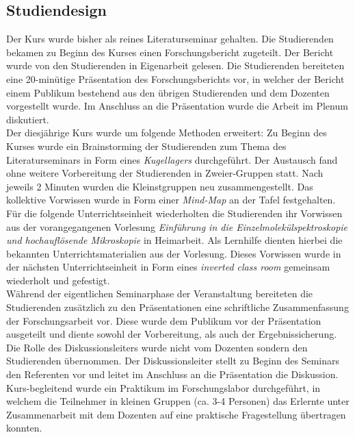 \subsection{Studiendesign}
Der Kurs wurde bisher als reines Literaturseminar gehalten. Die Studierenden bekamen zu Beginn des Kurses einen Forschungsbericht zugeteilt. Der Bericht wurde von den Studierenden in Eigenarbeit gelesen. Die Studierenden bereiteten eine 20-minütige Präsentation des Forschungsberichts vor, in welcher der Bericht einem Publikum bestehend aus den übrigen Studierenden und dem Dozenten vorgestellt wurde. Im Anschluss an die Präsentation wurde die Arbeit im Plenum diskutiert.\\
\noindent
Der diesjährige Kurs wurde um folgende Methoden erweitert: Zu Beginn des Kurses wurde ein Brainstorming der Studierenden zum Thema des Literaturseminars in Form eines {\it Kugellagers} durchgeführt. Der Austausch fand ohne weitere Vorbereitung der Studierenden in Zweier-Gruppen statt. Nach jeweils 2 Minuten wurden die Kleinstgruppen neu zusammengestellt. Das kollektive Vorwissen wurde in Form einer {\it Mind-Map} an der Tafel festgehalten. Für die folgende Unterrichtseinheit wiederholten die Studierenden ihr Vorwissen aus der vorangegangenen Vorlesung {\it Einführung in die Einzelmolekülspektroskopie und hochauflösende Mikroskopie} in Heimarbeit. Als Lernhilfe dienten hierbei die bekannten Unterrichtsmaterialien aus der Vorlesung. Dieses Vorwissen wurde in der nächsten Unterrichtseinheit in Form eines {\it inverted class room} gemeinsam wiederholt und gefestigt.\\
\noindent
Während der eigentlichen Seminarphase der Veranstaltung bereiteten die Studierenden zusätzlich zu den Präsentationen eine schriftliche Zusammenfassung der Forschungsarbeit vor. Diese wurde dem Publikum vor der Präsentation ausgeteilt und diente sowohl der Vorbereitung, als auch der Ergebnissicherung.\\
\noindent
Die Rolle des Diskussionsleiters wurde nicht vom Dozenten sondern den Studierenden übernommen. Der Diskussionsleiter stellt zu Beginn des Seminars den Referenten vor und leitet im Anschluss an die Präsentation die Diskussion. Kurs-begleitend wurde ein Praktikum im Forschungslabor durchgeführt, in welchem die Teilnehmer in kleinen Gruppen (ca. 3-4 Personen) das Erlernte unter Zusammenarbeit mit dem Dozenten auf eine praktische Fragestellung übertragen konnten.

